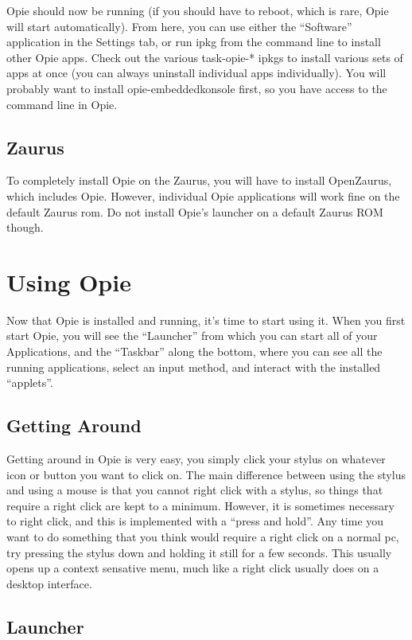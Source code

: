 \documentclass[12pt,letterpaper,oneside, openany]{book} \usepackage[latin1] {inputenc}
\begin{document}
Opie should now be running (if you should have to reboot, which is rare, Opie will start automatically). From here, you can use either the ``Software'' application in the Settings tab, or run ipkg from the command line to install other Opie apps. Check out the various task-opie-* ipkgs to install various sets of apps at once (you can always uninstall individual apps individually). You will probably want to install opie-embeddedkonsole first, so you have access to the command line in Opie. 

\section{Zaurus}

To completely install Opie on the Zaurus, you will have to install OpenZaurus, which includes Opie. However, individual Opie applications will work fine on the default Zaurus rom. Do not install Opie's launcher on a default Zaurus ROM though.

\chapter{Using Opie}
Now that Opie is installed and running, it's time to start using it.  When you first start Opie, you will see the ``Launcher'' from which you can start all of your Applications, and the ``Taskbar'' along the bottom, where you can see all the running applications, select an input method, and interact with the installed ``applets''.

\section{Getting Around}

Getting around in Opie is very easy, you simply click your stylus on whatever icon or button you want to click on.  The main difference between using the stylus and using a mouse is that you cannot right click with a stylus, so things that require a right click are kept to a minimum.  However, it is sometimes necessary to right click, and this is implemented with a ``press and hold''.  Any time you want to do something that you think would require a right click on a normal pc, try pressing the stylus down and holding it still for a few seconds.  This usually opens up a context sensative menu, much like a right click usually does on a desktop interface.

\section{Launcher}
\end{document}
